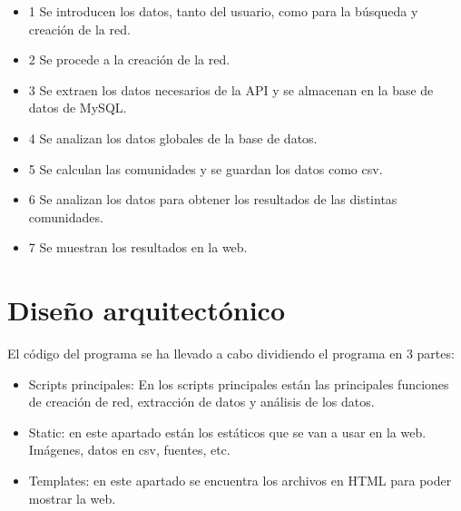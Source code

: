 \begin{itemize}
    \item 1 Se introducen los datos, tanto del usuario, como para la búsqueda y creación de la red.
    \item 2 Se procede a la creación de la red.
    \item 3 Se extraen los datos necesarios de la API y se almacenan en la base de datos de MySQL.
    \item 4 Se analizan los datos globales de la base de datos.
    \item 5 Se calculan las comunidades y se guardan los datos como csv.
    \item 6 Se analizan los datos para obtener los resultados de las distintas comunidades.
    \item 7 Se muestran los resultados en la web.
\end{itemize}


\section{Diseño arquitectónico}
El código del programa se ha llevado a cabo dividiendo el programa en 3 partes:

\begin{itemize}
    \item Scripts principales: En los scripts principales están las principales funciones de creación de red, extracción de datos y análisis de los datos.
\end{itemize}


\begin{itemize}
    \item Static: en este apartado están los estáticos que se van a usar en la web. Imágenes, datos en csv, fuentes, etc.
\end{itemize}


\begin{itemize}
    \item Templates: en este apartado se encuentra los archivos en HTML para poder mostrar la web.
\end{itemize}

